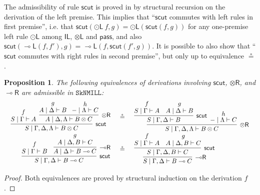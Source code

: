 \documentclass[sn-mathphys-num]{sn-jnl}%
\newcommand{\GG}{\Gamma}
\newcommand{\GD}{\Delta}
\newcommand{\GL}{\Lambda}
\newcommand{\vd}{\vdash}
\newcommand{\tl}{\otimes \mathsf{L}}
\newcommand{\tr}{\otimes\mathsf{R}}
\newcommand{\pass}{\mathsf{pass}}
\newcommand{\unitl}{\mathsf{IL}}
\newcommand{\ot}{\otimes}
\newcommand{\lolli}{\multimap}
\newcommand{\lleft}{{\lolli}\mathsf{L}}
\newcommand{\lright}{{\lolli}\mathsf{R}}
\newcommand{\SkNMILL}{$\mathtt{SkNMILL}$}
\newcommand{\mf}[1]{\mathsf{#1}}
\theoremstyle{thmstyleone}%
\newtheorem{proposition}[theorem]{Proposition}%
\theoremstyle{thmstyletwo}%
\theoremstyle{thmstylethree}%
\begin{document}
The admissibility of rule $\mf{scut}$ is proved in \cite{UVW:protsn,wan2024} by structural recursion on the derivation of the left premise.
This implies that ``$\mf{scut}$ commutes with left rules in first premise'', i.e. that $\mf{scut}(\odot\mathsf{L}\ f, g) = \odot\mathsf{L} (\mf{scut}(f, g))$ for any one-premise left rule $\odot\mathsf{L}$ among $\unitl$, $\tl$ and $\pass$, and also $\mf{scut}(\lleft (f,f'), g) = \lleft (f,\mf{scut}(f', g))$.
It is possible to also show that ``$\mf{scut}$ commutes with right rules in second premise'', but only up to equivalence $\circeq$.
\begin{proposition}\label{eq:scut:otr:-or}
The following equivalences of derivations involving $\mf{scut}$, $\tr$, and $\lright$ are admissible in \SkNMILL:
  \begin{displaymath}
  \begin{array}{rcl}
  \begin{array}{c}
    \infer[\mf{scut}]{S \mid \GG , \GD , \GL \vd B \ot C}{
      \deduce{S \mid \GG \vd A}{f}
      &
        \!\!\!
      \infer[\tr]{A \mid \GD , \GL \vd B \ot C}{
        \deduce{A \mid \GD \vd B}{g}
        & \!
        \deduce{{-} \mid \GL \vd C}{h}
      }
    }
  \end{array}
  &\circeq &
    \begin{array}{c}
      \infer[\tr]{S \mid \GG , \GD , \GL \vd B \ot C}{
        \infer[\mf{scut}]{S \mid \GG , \GD \vd B}{
          \deduce{S \mid \GG \vd A}{f}
          &
          \deduce{A \mid \GD \vd B}{g}
        }
        &
        \!\!\!
        \deduce{{-} \mid \GL \vd C}{h}
      }
    \end{array}
\\[20pt]
  \begin{array}{c}
    \infer[\mf{scut}]{S \mid \GG , \GD \vd B \lolli C}{
      \deduce{S \mid \GG \vd B}{f}
      &
      \infer[\lright]{A \mid \GD \vd B \lolli C}{
        \deduce{A \mid \GD , B \vd C}{g}
      }
    }
  \end{array}
  &
  \circeq
  &
    \begin{array}{c}
      \infer[\lright]{S \mid \GG , \GD \vd B \lolli C}{
        \infer[\mf{scut}]{S \mid \GG , \GD , B \vd C}{
          \deduce{S \mid \GG \vd A}{f}
          &
          \deduce{A \mid \GD , B \vd C}{g}
        }
        }
    \end{array}
  \end{array}
\end{displaymath}
\end{proposition}
\begin{proof}
  Both equivalences are proved by structural induction on the derivation $f$.
\end{proof}
\end{document}
